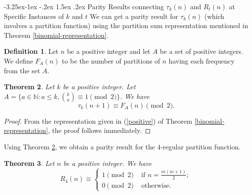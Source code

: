 \documentclass[10pt]{article}
\makeatletter
\renewcommand\subsection{\@startsection{subsection}{2}{\z@}
{-3.25ex\@plus -1ex \@minus -.2ex}
{1.5ex \@plus .2ex}
{\normalfont\normalsize\bfseries\boldmath}}
\newtheorem{theorem}{Theorem}[section]
\theoremstyle{definition}
\newtheorem{definition}[theorem]{Definition}
\makeatother
\begin{document}
\subsection{ Parity Results connecting $\tau_k(n)$ and $R_t(n)$ at Specific Instances of $k$ and $t$}
We can get a parity result for $\tau_{k}(n)$ (which involves a partition function) using the partition sum representation mentioned in Theorem \ref{binomial-representation}.
\begin{definition}
Let $n$ be a positive integer and let $A$ be a set of positive integers. We define $F_A(n)$ to be the number of partitions of $n$ having each frequency from the set $A$.
\end{definition}
\begin{theorem}\label{parity-gen}
Let $k$ be a positive integer. Let $A=\{a\in\mathbb N:a\leq k, {{k}\choose{a}}\equiv 1\pmod{2}\}$. We have
\begin{equation}
\tau_k(n+1)\equiv F_A(n)\pmod{2}.
\end{equation}
\end{theorem}
\begin{proof}
From the representation given in (\ref{positive}) of Theorem \ref{binomial-representation}, the proof follows immediately.
\end{proof}
Using Theorem \ref{parity-gen}, we obtain a parity result for the $4$-regular partition function. 
\begin{theorem}\label{parityoftau}
Let $n$ be a positive integer. We have
\begin{equation}
R_4(n)\equiv\begin{cases}1\pmod{2}&{\text { if }n=\frac{m(m+1)}{2}};\\ 
0\pmod{2}&{\text{ otherwise}}.
\end{cases}
\end{equation}
\end{theorem}
\end{document}
